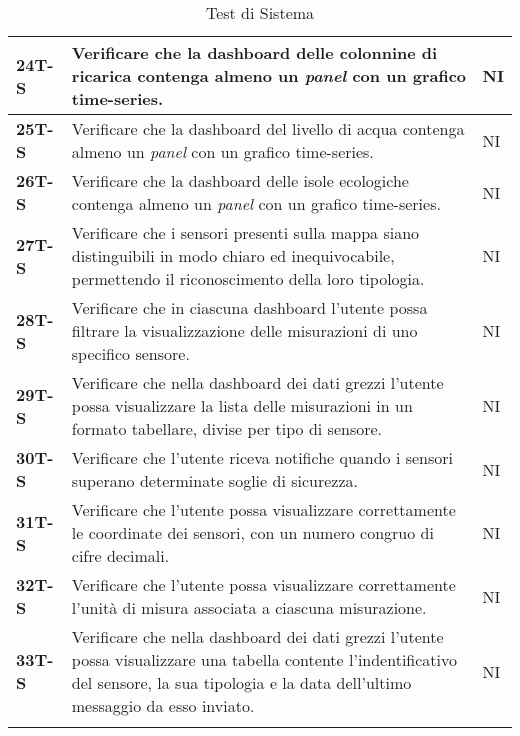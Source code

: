 \begin{longtable}{|>{\raggedright\arraybackslash}m{}|>{\raggedright\arraybackslash}m{}|>{\raggedright\arraybackslash}m{}|}
	\hline
	\textbf{24T-S}  & Verificare che la dashboard delle colonnine di ricarica contenga almeno un \textit{panel} con un grafico time-series.                                                                            & NI             \\
	\hline
	\textbf{25T-S}  & Verificare che la dashboard del livello di acqua contenga almeno un \textit{panel} con un grafico time-series.                                                                                   & NI             \\
	\hline
	\textbf{26T-S}  & Verificare che la dashboard delle isole ecologiche contenga almeno un \textit{panel} con un grafico time-series.                                                                                 & NI             \\
	\hline
	\textbf{27T-S}  & Verificare che i sensori presenti sulla mappa siano distinguibili in modo chiaro ed inequivocabile, permettendo il riconoscimento della loro tipologia.                                          & NI             \\
	\hline
	\textbf{28T-S}  & Verificare che in ciascuna dashboard l’utente possa filtrare la visualizzazione delle misurazioni di uno specifico sensore.                                                                      & NI             \\
	\hline
	\textbf{29T-S}  & Verificare che nella dashboard dei dati grezzi l’utente possa visualizzare la lista delle misurazioni in un formato tabellare, divise per tipo di sensore.                                       & NI             \\ %
	\hline
	\textbf{30T-S}  & Verificare che l’utente riceva notifiche quando i sensori superano determinate soglie di sicurezza.                                                                                          & NI             \\
	\hline
	\textbf{31T-S}  & Verificare che l’utente possa visualizzare correttamente le coordinate dei sensori, con un numero congruo di cifre decimali.                                                                     & NI             \\
	\hline
	\textbf{32T-S}  & Verificare che l’utente possa visualizzare correttamente l’unità di misura associata a ciascuna misurazione.                                                                                     & NI             \\
	\hline
	\textbf{33T-S}  & Verificare che nella dashboard dei dati grezzi l'utente possa visualizzare una tabella contente l'indentificativo del sensore, la sua tipologia e la data dell'ultimo messaggio da esso inviato. & NI             \\
	\hline
	\caption{Test di Sistema} %
	\label{table:14}
\end{longtable}


